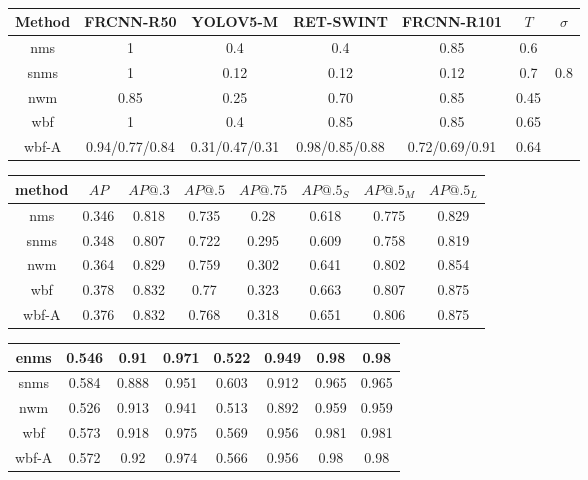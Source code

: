 \begin{table}
    \begin{tabular}{c||c|c|c|c|c|c}
        Method & FRCNN-R50      & YOLOV5-M       & RET-SWINT      & FRCNN-R101     & $T$  & $\sigma$ \\ \hline
        nms    & 1              & 0.4            & 0.4            & 0.85           & 0.6  &          \\ \hline
        snms   & 1              & 0.12           & 0.12           & 0.12           & 0.7  & 0.8      \\ \hline
        nwm    & 0.85           & 0.25           & 0.70           & 0.85           & 0.45 &          \\ \hline
        wbf    & 1              & 0.4            & 0.85           & 0.85           & 0.65 &          \\ \hline
        wbf-A  & 0.94/0.77/0.84 & 0.31/0.47/0.31 & 0.98/0.85/0.88 & 0.72/0.69/0.91 & 0.64 &          \\ \hline
    \end{tabular}
    \caption{}
\end{table}


\begin{table}
    \centering
    \begin{tabular}{c|c|c|c|c|c|c|c}

        method & $AP$  & $AP@.3$ & $AP@.5$ & $AP@.75$ & $AP@.5_S$ & $AP@.5_M$ & $AP@.5_L$ \\ \hline \hline
        nms    & 0.346 & 0.818   & 0.735   & 0.28     & 0.618     & 0.775     & 0.829     \\ \hline
        snms   & 0.348 & 0.807   & 0.722   & 0.295    & 0.609     & 0.758     & 0.819     \\ \hline
        nwm    & 0.364 & 0.829   & 0.759   & 0.302    & 0.641     & 0.802     & 0.854     \\ \hline
        wbf    & 0.378 & 0.832   & 0.77    & 0.323    & 0.663     & 0.807     & 0.875     \\ \hline
        wbf-A  & 0.376 & 0.832   & 0.768   & 0.318    & 0.651     & 0.806     & 0.875     \\ \hline
    \end{tabular}
\end{table}


\begin{table}
    \centering
    \begin{tabular}{c|c|c|c|c|c|c|c}
        enms  & 0.546 & 0.91  & 0.971 & 0.522 & 0.949 & 0.98  & 0.98  \\ \hline
        snms  & 0.584 & 0.888 & 0.951 & 0.603 & 0.912 & 0.965 & 0.965 \\ \hline
        nwm   & 0.526 & 0.913 & 0.941 & 0.513 & 0.892 & 0.959 & 0.959 \\ \hline
        wbf   & 0.573 & 0.918 & 0.975 & 0.569 & 0.956 & 0.981 & 0.981 \\ \hline
        wbf-A & 0.572 & 0.92  & 0.974 & 0.566 & 0.956 & 0.98  & 0.98  \\ \hline
    \end{tabular}
\end{table}


